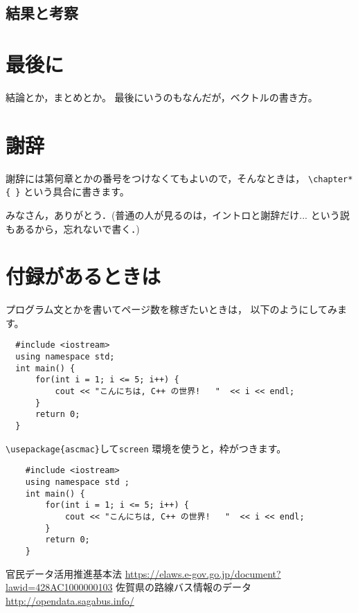 \documentclass[a4paper, 12pt]{jsreport}
\begin{document}
  \section{結果と考察}


  \chapter{最後に}
  結論とか，まとめとか。 最後にいうのもなんだが，ベクトルの書き方。

  \chapter*{謝辞}


  謝辞には第何章とかの番号をつけなくてもよいので，そんなときは，
  \verb|\chapter*{ }| という具合に書きます。

  みなさん，ありがとう．(普通の人が見るのは，イントロと謝辞だけ...
  という説もあるから，忘れないで書く．)

  \appendix
  \chapter{付録があるときは}
  プログラム文とかを書いてページ数を稼ぎたいときは， 以下のようにしてみます。

  \begin{verbatim}
  #include <iostream>
  using namespace std;
  int main() {
      for(int i = 1; i <= 5; i++) {
          cout << "こんにちは, C++ の世界!   "  << i << endl;
      }
      return 0;
  }
  \end{verbatim}
  \verb|\usepackage{ascmac}|して\verb|screen| 環境を使うと，枠がつきます。
  \begin{screen}
    \begin{verbatim}
    #include <iostream>
    using namespace std ;
    int main() {
        for(int i = 1; i <= 5; i++) {
            cout << "こんにちは, C++ の世界!   "  << i << endl;
        }
        return 0;
    }
    \end{verbatim}
  \end{screen}

  \begin{thebibliography}{99}
     官民データ活用推進基本法 \url{https://elaws.e-gov.go.jp/document?lawid=428AC1000000103}
     佐賀県の路線バス情報のデータ \url{http://opendata.sagabus.info/}
  \end{thebibliography}
\end{document}
